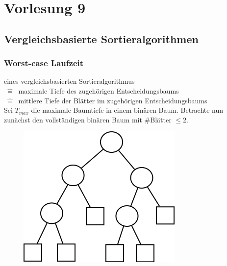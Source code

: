 \newcommand{\hl}[1]{\colorbox{yellow}{#1}}

\chapter{Vorlesung 9}
\section{Vergleichsbasierte Sortieralgorithmen}

\subsection{Worst-case Laufzeit}

eines vergleichsbasierten Sortieralgorithmus \\$~\hat{=}~$ maximale Tiefe des zugehörigen Entscheidungsbaums \\$~\hat{=}~$ mittlere Tiefe der Blätter im zugehörigen Entscheidungsbaums\\

Sei $T_{max}$ die maximale Baumtiefe in einem binären Baum. 
Betrachte nun zunächst den vollständigen binären Baum mit \#Blätter $\leq 2$. \\


\begin{figure}
	\vspace{-50pt}
\includegraphics[width=\linewidth]{9/Grafik/img1.png}
\caption{}
\end{figure}

